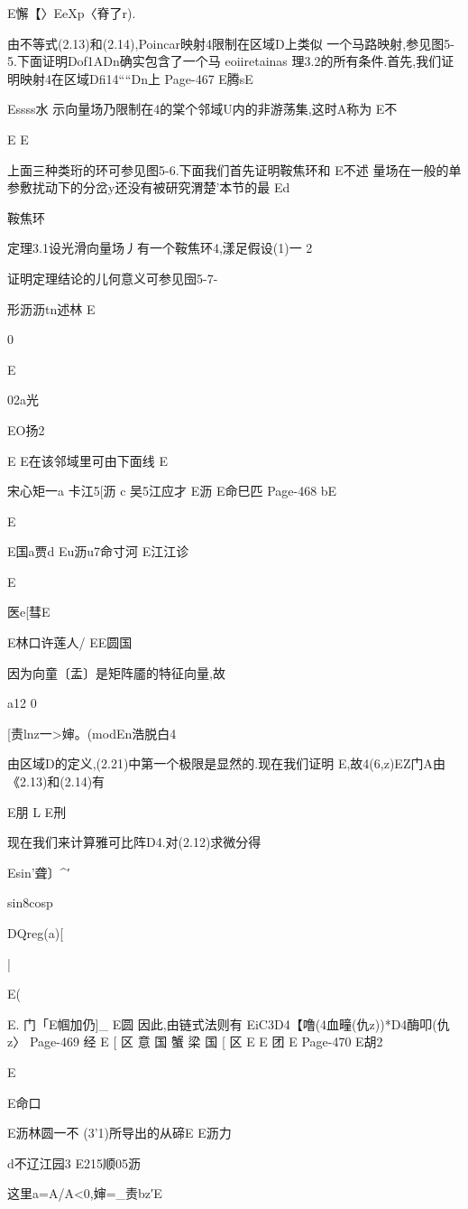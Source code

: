 {{{E懈【〉EeXp〈脊了r).

由不等式(2.13)和(2.14),Poincar映射4限制在区域D上类似
一个马路映射,参见图5-5.下面证明Dof1ADn确实包含了一个马
eoiiretainas
理3.2的所有条件.首先,我们证明映射4在区域Dfi14““Dn上
Page-467
E腾sE

Essss水
示向量场乃限制在4的棠个邻域U内的非游荡集,这时A称为
E不

E
E

上面三种类珩的环可参见图5-6.下面我们首先证明鞍焦环和
E不述
量场在一般的单参敷扰动下的分岔y还没有被研究渭楚'本节的最
Ed

鞍焦环

定理3.1设光滑向量场丿有一个鞍焦环4,漾足假设(1)一
2

证明定理结论的儿何意义可参见囹5-7-

形沥沥tn述林
E

0

E

02a光

EO扬2

E
E在该邻域里可由下面线
E

宋心矩一a
卡江5[沥
c
吴5江应才
E沥
E命巳匹
Page-468
bE

E

E国a贾d
Eu沥u7命寸河
E江江诊

E

医e[彗E

E林口许莲人/
EE圆国

因为向童〔盂〕是矩阵靥的特征向量,故

a12
0

[责lnz一>婶。(modEn浩脱白4

由区域D的定义,(2.21)中第一个极限是显然的.现在我们证明
E,故4(6,z)EZ门A由
《2.13)和(2.14)有

E朋
L
E刑

现在我们来计算雅可比阵D4.对(2.12)求微分得

Esin'聋〕^′

sin8cosp

DQreg(a)[

|

E(

E.
门「E帼加仍]_
E圆
因此,由链式法则有
EiC3D4【噜(4血疃(仇z))*D4酶叩(仇z〉
Page-469
经
E
[
区
意
国
蟹
梁
国
[
区
E
E
团
E
Page-470
E胡2

E

E命口

E沥林圆一不
(3'1)所导出的从碲E
E沥力

d不辽江园3
E215顺05沥

这里a=A/A<0,婶=_责bz′E

}}}
